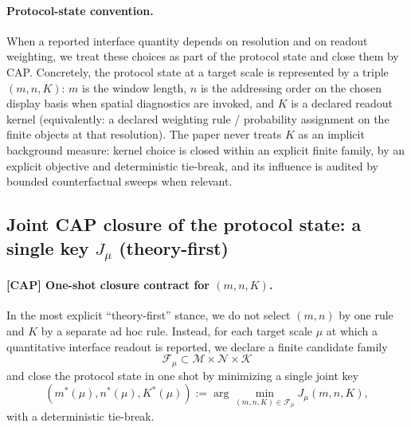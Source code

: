 \paragraph{Protocol-state convention.}
\InterfaceTag When a reported interface quantity depends on resolution and on readout weighting, we treat these choices as part of the protocol state and close them by CAP.
Concretely, the protocol state at a target scale is represented by a triple $(m,n,K)$:
$m$ is the window length, $n$ is the addressing order on the chosen display basis when spatial diagnostics are invoked, and $K$ is a declared readout kernel (equivalently: a declared weighting rule / probability assignment on the finite objects at that resolution).
\AuditTag The paper never treats $K$ as an implicit background measure: kernel choice is closed within an explicit finite family, by an explicit objective and deterministic tie-break, and its influence is audited by bounded counterfactual sweeps when relevant.

\subsection{Joint CAP closure of the protocol state: a single key \texorpdfstring{$J_\mu$}{J_mu} (theory-first)}
\label{subsec:tick_cap_joint_key_contract}

\paragraph{[CAP] One-shot closure contract for \texorpdfstring{$(m,n,K)$}{(m,n,K)}.}
\AuditTag In the most explicit ``theory-first'' stance, we do not select $(m,n)$ by one rule and $K$ by a separate ad hoc rule.
Instead, for each target scale $\mu$ at which a quantitative interface readout is reported, we declare a finite candidate family
\[
\mathcal{F}_\mu \subset \mathcal{M}\times \mathcal{N}\times \mathcal{K}
\]
and close the protocol state in one shot by minimizing a single joint key
\[
(m^\ast(\mu),n^\ast(\mu),K^\ast(\mu)):=\arg\min_{(m,n,K)\in\mathcal{F}_\mu} J_\mu(m,n,K),
\]
with a deterministic tie-break.

